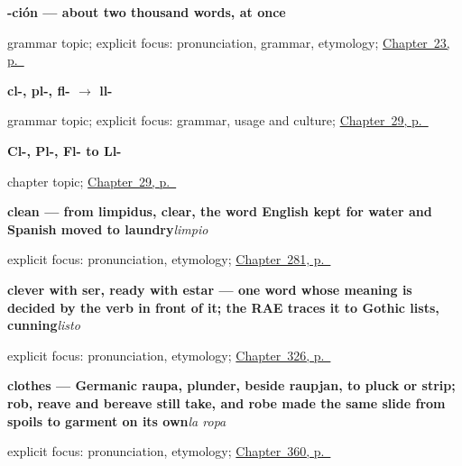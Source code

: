 \noindent\begin{minipage}[t]{\linewidth}
\raggedright
\textbf{-ción — about two thousand words, at once}\par
\footnotesize grammar topic; explicit focus: pronunciation, grammar, etymology; \hyperref[ch:friend-cion]{Chapter~23, p.~\pageref*{ch:friend-cion}}
\end{minipage}\par\smallskip

\noindent\begin{minipage}[t]{\linewidth}
\raggedright
\textbf{cl-, pl-, fl- $\to$ ll-}\par
\footnotesize grammar topic; explicit focus: grammar, usage and culture; \hyperref[ch:sound-cluster-ll]{Chapter~29, p.~\pageref*{ch:sound-cluster-ll}}
\end{minipage}\par\smallskip

\noindent\begin{minipage}[t]{\linewidth}
\raggedright
\textbf{Cl-, Pl-, Fl- to Ll-}\par
\footnotesize chapter topic; \hyperref[ch:sound-cluster-ll]{Chapter~29, p.~\pageref*{ch:sound-cluster-ll}}
\end{minipage}\par\smallskip

\noindent\begin{minipage}[t]{\linewidth}
\raggedright
\textbf{clean — from limpidus, clear, the word English kept for water and Spanish moved to laundry}\enspace\emph{limpio}\par
\footnotesize explicit focus: pronunciation, etymology; \hyperref[ch:cuatro-adjetivos]{Chapter~281, p.~\pageref*{ch:cuatro-adjetivos}}
\end{minipage}\par\smallskip

\noindent\begin{minipage}[t]{\linewidth}
\raggedright
\textbf{clever with ser, ready with estar — one word whose meaning is decided by the verb in front of it; the RAE traces it to Gothic lists, cunning}\enspace\emph{listo}\par
\footnotesize explicit focus: pronunciation, etymology; \hyperref[ch:nervioso-y-listo]{Chapter~326, p.~\pageref*{ch:nervioso-y-listo}}
\end{minipage}\par\smallskip

\noindent\begin{minipage}[t]{\linewidth}
\raggedright
\textbf{clothes — Germanic raupa, plunder, beside raupjan, to pluck or strip; rob, reave and bereave still take, and robe made the same slide from spoils to garment on its own}\enspace\emph{la ropa}\par
\footnotesize explicit focus: pronunciation, etymology; \hyperref[ch:la-ropa-y-el-zapato]{Chapter~360, p.~\pageref*{ch:la-ropa-y-el-zapato}}
\end{minipage}\par\smallskip

